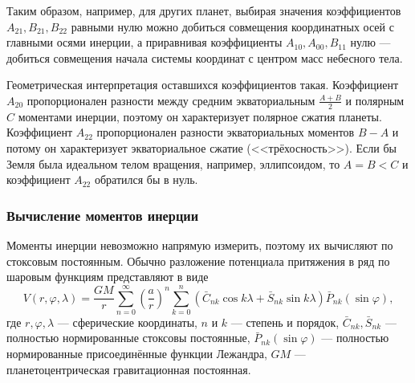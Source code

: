 \documentclass[11pt, a4paper,addpoints]{exam}
\theoremstyle{remark}
\renewcommand{\phi}{\ensuremath{\varphi}}
\begin{document}
    Таким образом, например, для других планет, выбирая значения коэффициентов $A_{21}, B_{21},
    B_{22}$ равными нулю можно добиться совмещения координатных осей с главными осями инерции, а
    приравнивая коэффициенты $A_{10}, A_{00}, B_{11}$ нулю --- добиться совмещения начала системы координат с
    центром масс небесного тела.

    Геометрическая интерпретация оставшихся коэффициентов такая. Коэффициент $A_{20}$ пропорционален
    разности между средним экваториальным $\frac{A+B}{2}$ и полярным
    $C$ моментами инерции, поэтому он характеризует полярное сжатия планеты. Коэффициент
    $A_{22}$ пропорционален разности экваториальных моментов $B-A$ и потому он характеризует
    экваториальное сжатие (<<трёхосность>>). Если бы Земля была идеальном телом вращения, например, 
    эллипсоидом, то $A = B < C$ и коэффициент $A_{22}$ обратился бы в нуль.

    \subsubsection*{Вычисление моментов инерции}
    Моменты инерции невозможно напрямую измерить, поэтому их вычисляют по стоксовым
    постоянным. Обычно разложение потенциала притяжения в ряд по шаровым функциям представляют в виде
    \begin{equation}
        V \left( r, \phi, \lambda \right) = \dfrac{GM}{r}   
            \sum\limits_{n=0}^{\infty} \left( \dfrac{a}{r} \right)^n
        \sum\limits_{k=0}^{n} \left(  
        \bar{C}_{nk}\cos{k\lambda} + \bar{S}_{nk}\sin{k\lambda}
        \right) \bar{P}_{nk} \left( \sin{\phi} \right),
    \end{equation}
    где $r, \phi, \lambda$ --- сферические координаты, $n$ и $k$ --- степень и порядок,
    $\bar{C}_{nk},\bar{S}_{nk}$ --- полностью нормированные стоксовы постоянные, 
    $\bar{P}_{nk}\left( \sin{\phi} \right)$ --- полностью нормированные присоединённые функции
    Лежандра, $GM$ --- планетоцентрическая гравитационная постоянная.
\end{document}
